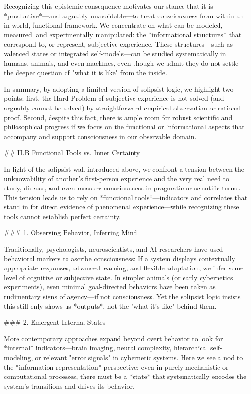 Recognizing this epistemic consequence motivates our stance that it is *productive*—and arguably unavoidable—to treat consciousness from within an in-world, functional framework. We concentrate on what can be modeled, measured, and experimentally manipulated: the *informational structures* that correspond to, or represent, subjective experience. These structures—such as valenced states or integrated self-models—can be studied systematically in humans, animals, and even machines, even though we admit they do not settle the deeper question of "what it is like" from the inside.

In summary, by adopting a limited version of solipsist logic, we highlight two points: first, the Hard Problem of subjective experience is not solved (and arguably cannot be solved) by straightforward empirical observation or rational proof. Second, despite this fact, there is ample room for robust scientific and philosophical progress if we focus on the functional or informational aspects that accompany and support consciousness in our observable domain. 


## II.B Functional Tools vs. Inner Certainty

In light of the solipsist wall introduced above, we confront a tension between the unknowability of another's first-person experience and the very real need to study, discuss, and even measure consciousness in pragmatic or scientific terms. This tension leads us to rely on *functional tools*—indicators and correlates that stand in for direct evidence of phenomenal experience—while recognizing these tools cannot establish perfect certainty.

### 1. Observing Behavior, Inferring Mind

Traditionally, psychologists, neuroscientists, and AI researchers have used behavioral markers to ascribe consciousness: If a system displays contextually appropriate responses, advanced learning, and flexible adaptation, we infer some level of cognitive or subjective state. In simpler animals (or early cybernetics experiments), even minimal goal-directed behaviors have been taken as rudimentary signs of agency—if not consciousness. Yet the solipsist logic insists this still only shows us *outputs*, not the "what it's like" behind them.

### 2. Emergent Internal States

More contemporary approaches expand beyond overt behavior to look for *internal* indicators—brain imaging, neural complexity, hierarchical self-modeling, or relevant "error signals" in cybernetic systems. Here we see a nod to the *information representation* perspective: even in purely mechanistic or computational processes, there must be a *state* that systematically encodes the system's transitions and drives its behavior.

